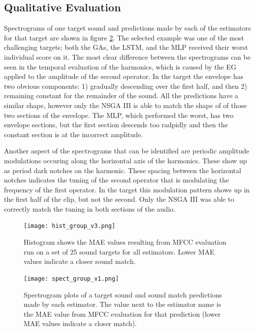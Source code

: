 
\subsection{Qualitative Evaluation}
Spectrograms of one target sound and predictions made by each of the estimators for that target are shown in figure \ref{fig:group_spect}. The selected example was one of the most challenging targets; both the GAs, the LSTM, and the MLP received their worst individual score on it. The most clear difference between the spectrograms can be seen in the temporal evaluation of the harmonics, which is caused by the EG applied to the amplitude of the second operator. In the target the envelope has two obvious components: 1) gradually descending over the first half, and then 2) remaining constant for the remainder of the sound. All the predictions have a similar shape, however only the NSGA III is able to match the shape of of those two sections of the envelope. The MLP, which performed the worst, has two envelope sections, but the first section descends too radpidly and then the constant section is at the incorrect amplitude.

Another aspect of the spectrograms that can be identified are periodic amplitude modulations occuring along the horizontal axis of the harmonics. These show up as period dark notches on the harmonic. These spacing between the horizontal notches indicates the tuning of the second operator that is modulating the frequency of the first operator. In the target this modulation pattern shows up in the first half of the clip, but not the second. Only the NSGA III was able to correctly match the tuning in both sections of the audio. 


\begin{figure}[t]
\begin{center}
\texttt{[image: hist\_group\_v3.png]}
\caption{Histogram shows the MAE values resulting from MFCC evaluation run on a set of 25 sound targets for all estimators. Lower MAE values indicate a closer sound match.}
\label{fig:group_hist}
\end{center}
\end{figure}

\begin{figure}[t]
\begin{center}
\texttt{[image: spect\_group\_v1.png]}
\caption{Spectrogram plots of a target sound and sound match predictions made by each estimator. The value next to the estimator name is the MAE value from MFCC evaluation for that prediction (lower MAE values indicate a closer match).}
\label{fig:group_spect}
\end{center}
\end{figure}

